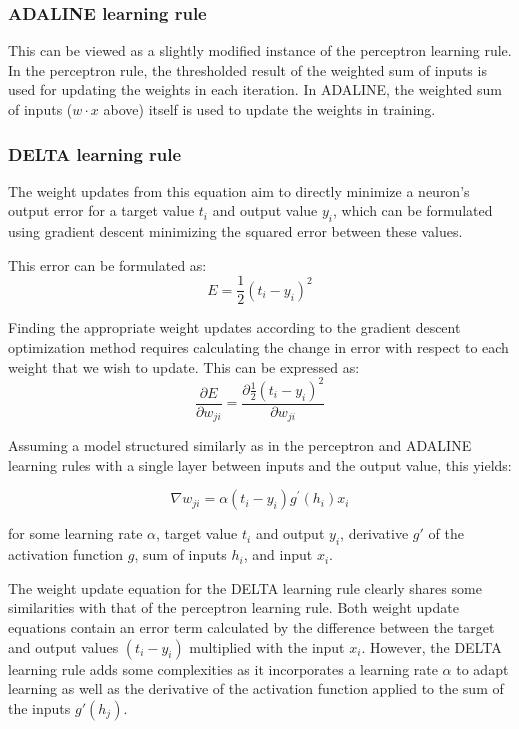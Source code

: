 \documentclass[main]{subfiles}
\begin{document}
\subsubsection{ADALINE learning rule}

This can be viewed as a slightly modified instance of the perceptron learning rule. In the perceptron rule, the thresholded result of the weighted sum of inputs is used for updating the weights in each iteration. In ADALINE, the weighted sum of inputs ($w \cdot x$ above) itself is used to update the weights in training.

\subsubsection{DELTA learning rule}

The weight updates from this equation aim to directly minimize a neuron's output error for a target value $t_i$ and output value $y_i$, which can be formulated using gradient descent minimizing the squared error between these values.

This error can be formulated as:
$$E = \frac{1}{2} (t_i - y_i)^2$$

Finding the appropriate weight updates according to the gradient descent optimization method requires calculating the change in error with respect to each weight that we wish to update. This can be expressed as:
$$\frac{\partial E}{\partial w_{ji}} = \frac{\partial \frac{1}{2} (t_i - y_i)^2}{\partial w_{ji}}$$

Assuming a model structured similarly as in the perceptron and ADALINE learning rules with a single layer between inputs and the output value, this yields:

$$\nabla w_{ji} = \alpha (t_i - y_i) g^'(h_i) x_i$$

for some learning rate $\alpha$, target value $t_i$ and output $y_i$, derivative $g'$ of the activation function $g$, sum of inputs $h_i$, and input $x_i$.

The weight update equation for the DELTA learning rule clearly shares some similarities with that of the perceptron learning rule. Both weight update equations contain an error term calculated by the difference between the target and output values $(t_i - y_i)$ multiplied with the input $x_i$. However, the DELTA learning rule adds some complexities as it incorporates a learning rate $\alpha$ to adapt learning as well as the derivative of the activation function applied to the sum of the inputs $g'(h_j)$.
\end{document}
